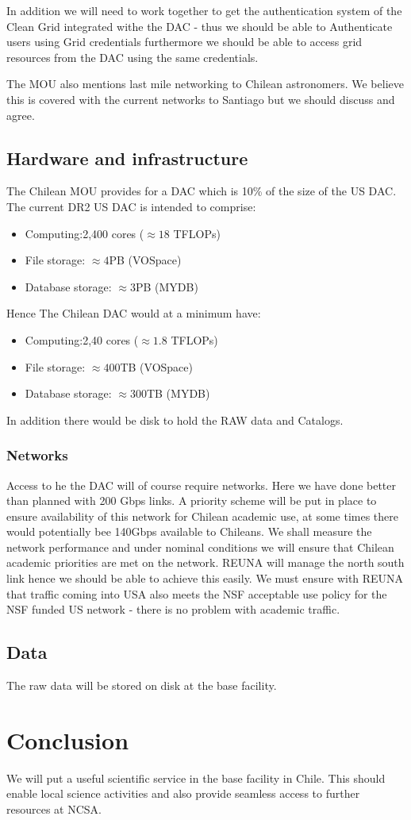 In addition we will need to work together to get the authentication system of the Clean Grid integrated withe the DAC - thus we should be able to Authenticate users using Grid credentials furthermore we should be able to access grid resources from the DAC using the same credentials.

The MOU also mentions last mile networking to Chilean astronomers. We believe this is covered with the current networks to Santiago but we should discuss and agree.

\subsection{Hardware and infrastructure}
The Chilean MOU provides for a DAC which is 10\% of the size of the US DAC. The current DR2 US DAC is intended to comprise:
\begin{itemize}
\item Computing:2,400 cores ($\approx 18$ TFLOPs)
\item File storage: $\approx 4 $PB  (VOSpace)
\item Database storage: $\approx 3 $PB (MYDB)

\end{itemize}

Hence The Chilean DAC would at a minimum have:
\begin{itemize}
\item Computing:2,40 cores ($\approx 1.8$ TFLOPs)
\item File storage: $\approx 400 $TB  (VOSpace)
\item Database storage: $\approx 300 $TB (MYDB)

\end{itemize}

In addition there would be disk to hold the RAW data and Catalogs.

\subsubsection{Networks}
Access to he the DAC will of course require networks. Here we have done better than planned with 200 Gbps links.
A priority scheme will be put in place to ensure availability of this network  for Chilean academic use, at some times there would potentially bee 140Gbps available to Chileans.  We shall measure the network performance and under nominal conditions we will ensure that Chilean academic priorities are met on the network. REUNA will manage the north south link hence we should be able to achieve this easily.  We must ensure with REUNA that traffic coming into USA also meets the NSF acceptable use policy for the NSF funded US network - there is no problem with academic traffic.


\subsection{Data }

The raw data will be stored on disk at the base facility.



\section{Conclusion}
We will put a useful scientific service in the base facility in Chile. This should enable local science activities and also provide seamless access to further resources at NCSA.
